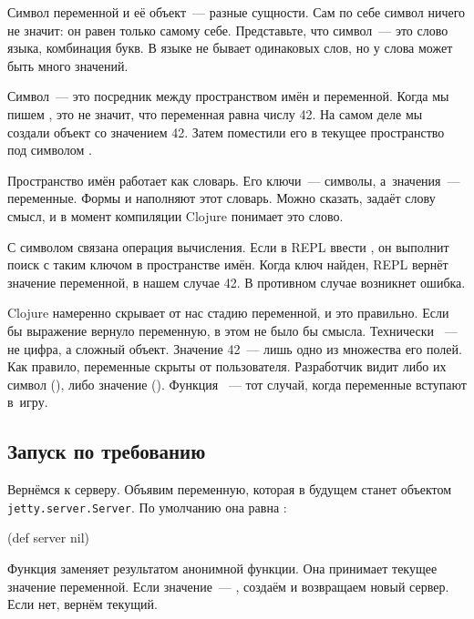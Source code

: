 

Символ переменной и её объект~--- разные сущности. Сам по себе
символ ничего не значит: он равен только самому себе. Представьте, что символ~---
это слово языка, комбинация букв. В языке не бывает одинаковых слов, но у
слова может быть много значений.


Символ~--- это посредник между пространством имён и переменной. Когда мы пишем
, это не значит, что переменная  равна числу
42. На самом деле мы создали объект  со значением 42. Затем
поместили его в текущее пространство под символом .

Пространство имён работает как словарь. Его ключи~--- символы, а~значения~---
переменные. Формы  и  наполняют этот словарь. Можно
сказать,  задаёт слову смысл, и в момент компиляции Clojure
понимает это слово.

С символом связана операция вычисления. Если в REPL ввести ,
он выполнит поиск с таким ключом в пространстве имён. Когда ключ найден, REPL
вернёт значение переменной, в нашем случае 42. В противном случае возникнет
ошибка.

Clojure намеренно скрывает от нас стадию переменной, и это правильно. Если бы
выражение  вернуло переменную, в этом не было бы смысла. Технически
~--- не цифра, а сложный объект. Значение 42~--- лишь одно из
множества его полей. Как правило, переменные скрыты от пользователя. Разработчик
видит либо их символ (), либо значение (). Функция
~--- тот случай, когда переменные вступают в~игру.

\ifafive\vspace{20mm}\fi

\subsection{Запуск по требованию}

Вернёмся к серверу. Объявим переменную, которая в будущем станет объектом
\texttt{jetty.server\-.Server}. По умолчанию она равна :

\begin{clojure}
(def server nil)
\end{clojure}

Функция  заменяет  результатом анонимной функции. Она
принимает текущее значение переменной. Если значение~--- , создаём и
возвращаем новый сервер. Если нет, вернём текущий.

